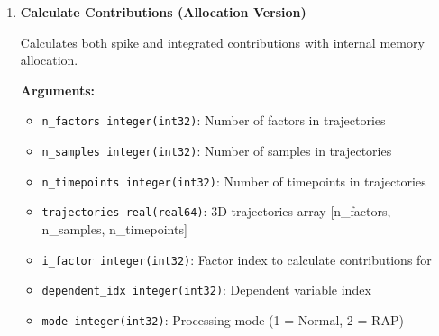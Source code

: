 \begin{enumerate}
\begin{enumerate}
\begin{itemize}
                    \item \texttt{ierr integer(int32)}: Error code
                  \end{itemize}
                  \begin{lstlisting}[language=Fortran, caption={Expert Contributions Calculation}]
call calc_contributions(trajectories, n_factors, n_samples, & 
                n_timepoints, i_factor, dependent_idx, mode, &
                spike_contribs, integrated_contribs, &
                temp_factor_vector, temp_dependent_vector, ierr)
                  \end{lstlisting}
                  
            \item \textbf{Calculate Contributions (Allocation Version)}
                  
                  Calculates both spike and integrated contributions with internal memory
                  allocation.
                  
                  \textbf{Arguments:}
                  \begin{itemize}
                    \item \texttt{n\_factors integer(int32)}: Number of factors in trajectories
                          
                    \item \texttt{n\_samples integer(int32)}: Number of samples in trajectories
                          
                    \item \texttt{n\_timepoints integer(int32)}: Number of timepoints in
                          trajectories
                          
                    \item \texttt{trajectories real(real64)}: 3D trajectories array [n\_factors,
                    n\_samples, n\_timepoints]
                    
                    \item \texttt{i\_factor integer(int32)}: Factor index to calculate contributions
                          for
                          
                    \item \texttt{dependent\_idx integer(int32)}: Dependent variable index
                          
                    \item \texttt{mode integer(int32)}: Processing mode (1 = Normal, 2 =
                          RAP)
                          

\end{itemize}
\end{enumerate}
\end{enumerate}
